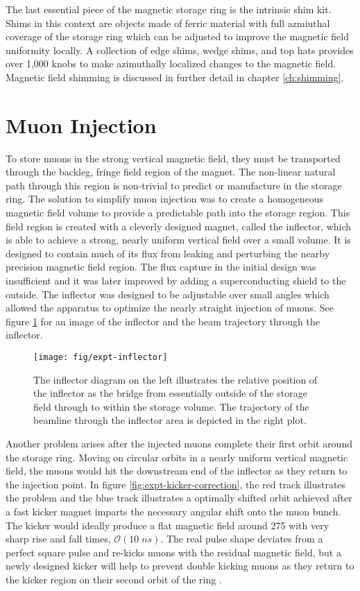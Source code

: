 The last essential piece of the magnetic storage ring is the intrinsic shim kit.  Shims in this context are objects made of ferric material with full azmiuthal coverage of the storage ring which can be adjusted to improve the magnetic field uniformity locally. A collection of edge shims, wedge shims, and top hats provides over 1,000 knobs to make azimuthally localized changes to the magnetic field.
Magnetic field shimming is discussed in further detail in chapter \ref{ch:shimming}.

\section{Muon Injection} \label{sec:muon-injection}
To store muons in the strong vertical magnetic field, they must be transported through the backleg, fringe field region of the magnet.  The non-linear natural path through this region is non-trivial to predict or manufacture in the storage ring.  The solution to simplify muon injection was to create a homogeneous magnetic field volume to provide a predictable path into the storage region. This field region is created with a cleverly designed magnet, called the inflector, which is able to achieve a strong, nearly uniform vertical field over a small volume.  It is designed to contain much of its flux from leaking and perturbing the nearby precision magnetic field region.  The flux capture in the initial design was insufficient and it was later improved by adding a superconducting shield to the outside.  The inflector was designed to be adjustable over small angles which allowed the apparatus to optimize the nearly straight injection of muons. See figure \ref{fig:expt-inflector} for an image of the inflector and the beam trajectory through the inflector. \cite{e989-tdr, e821-prd}

\begin{figure}
\label{fig:expt-inflector}
\texttt{[image: fig/expt-inflector]}
\caption{The inflector diagram on the left illustrates the relative position of the inflector as the bridge from essentially outside of the storage field through to within the storage volume.  The trajectory of the beamline through the inflector area is depicted in the right plot.}
\end{figure}

Another problem arises after the injected muons complete their first orbit around the storage ring.  Moving on circular orbits in a nearly uniform vertical magnetic field, the muons would hit the downstream end of the inflector as they return to the injection point.  In figure \ref{fig:expt-kicker-correction}, the red track illustrates the problem and the blue track illustrates a optimally shifted orbit achieved after a fast kicker magnet imparts the necessary angular shift onto the muon bunch.  The kicker would ideally produce a flat magnetic field around \SI{275}{\gauss} with very sharp rise and fall times, $\mathcal{O}(10\;ns)$.  The real pulse shape deviates from a perfect square pulse and re-kicks muons with the residual magnetic field, but a newly designed kicker will help to prevent double kicking muons as they return to the kicker region on their second orbit of the ring \cite{e989-tdr}.  

